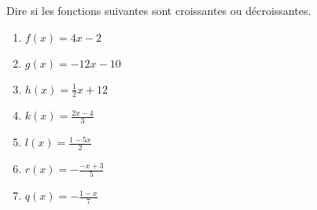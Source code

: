 
\begin{exercice}\label{exosmath-0501}

    Dire si les fonctions suivantes sont croissantes ou décroissantes.
    \begin{multicols}{2}
        \begin{enumerate}
            \item
                \( f(x)=4x-2\)
            \item
                \( g(x)=-12x-10\)
            \item
                \( h(x)=\frac{ 1 }{ 2 }x+12\)
            \item
                \( k(x)=\frac{ 2x-4 }{ 3 }\)
            \item
                \( l(x)=\frac{ 1-5x }{ 2 }\)
            \item
                \( r(x)=-\frac{ -x+3 }{ 5 }\)
            \item
                \( q(x)=-\frac{ 1-x }{ 7 }\)
        \end{enumerate}
    \end{multicols}

\end{exercice}
